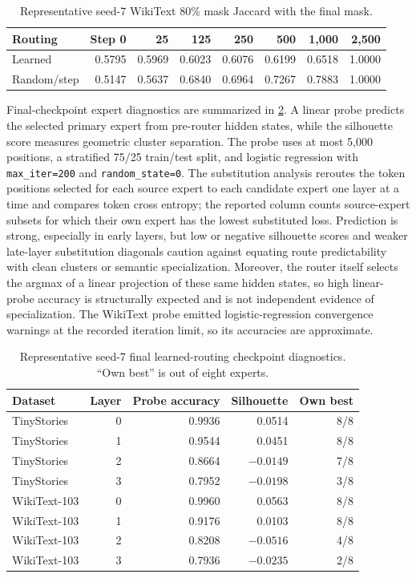 \documentclass{article}
\begin{document}
\begin{table}[t]
\centering
\scriptsize
\caption{Representative seed-7 WikiText 80\% mask Jaccard with the final mask.}
\label{tab:app_temporal_masks}
\begin{tabular}{@{}lrrrrrrr@{}}
\toprule
Routing & Step 0 & 25 & 125 & 250 & 500 & 1,000 & 2,500 \\
\midrule
Learned & 0.5795 & 0.5969 & 0.6023 & 0.6076 & 0.6199 & 0.6518 & 1.0000 \\
Random/step & 0.5147 & 0.5637 & 0.6840 & 0.6964 & 0.7267 & 0.7883 & 1.0000 \\
\bottomrule
\end{tabular}
\end{table}

Final-checkpoint expert diagnostics are summarized in
\cref{tab:app_expert_diagnostics}. A linear probe predicts the selected primary
expert from pre-router hidden states, while the silhouette score measures
geometric cluster separation. The probe uses at most 5,000 positions, a
stratified 75/25 train/test split, and logistic regression with
\texttt{max\_iter=200} and \texttt{random\_state=0}. The substitution analysis
reroutes the token positions selected for each source expert to each candidate
expert one layer at a time and compares token cross entropy; the reported
column counts source-expert subsets for which their own expert has the lowest
substituted loss.
Prediction is strong, especially in early layers, but low or negative
silhouette scores and weaker late-layer substitution diagonals caution against
equating route predictability with clean clusters or semantic specialization.
Moreover, the router itself selects the argmax of a linear projection of these
same hidden states, so high linear-probe accuracy is structurally expected and
is not independent evidence of specialization. The WikiText probe emitted
logistic-regression convergence warnings at the recorded iteration limit, so
its accuracies are approximate.

\begin{table}[t]
\centering
\scriptsize
\caption{Representative seed-7 final learned-routing checkpoint diagnostics.
``Own best'' is out of eight experts.}
\label{tab:app_expert_diagnostics}
\begin{tabular}{@{}lrrrr@{}}
\toprule
Dataset & Layer & Probe accuracy & Silhouette & Own best \\
\midrule
TinyStories & 0 & 0.9936 & 0.0514 & 8/8 \\
TinyStories & 1 & 0.9544 & 0.0451 & 8/8 \\
TinyStories & 2 & 0.8664 & $-0.0149$ & 7/8 \\
TinyStories & 3 & 0.7952 & $-0.0198$ & 3/8 \\
WikiText-103 & 0 & 0.9960 & 0.0563 & 8/8 \\
WikiText-103 & 1 & 0.9176 & 0.0103 & 8/8 \\
WikiText-103 & 2 & 0.8208 & $-0.0516$ & 4/8 \\
WikiText-103 & 3 & 0.7936 & $-0.0235$ & 2/8 \\
\bottomrule
\end{tabular}
\end{table}
\end{document}

